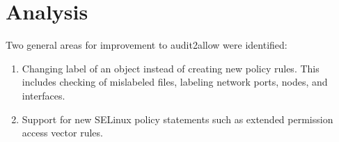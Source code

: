 
\chapter{Analysis}
\label{analysis}
Two general areas for improvement to audit2allow were identified:
\begin{enumerate}
    \item Changing label of an object instead of creating new policy rules. This
        includes checking of mislabeled files, labeling network ports, nodes,
        and interfaces.
    \item Support for new SELinux policy statements such as extended permission
        access vector rules.
\end{enumerate}

